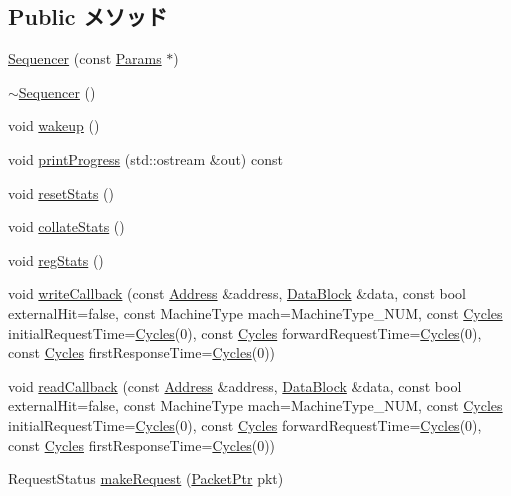 \subsection*{Public メソッド}
\begin{DoxyCompactItemize}
\item 
\hyperlink{classSequencer_a5f15f2d0a36488220062dc04ca597b6e}{Sequencer} (const \hyperlink{classSequencer_a55b8bba242820df379c5d9139a854e5b}{Params} $\ast$)
\item 
\hyperlink{classSequencer_a33e9de4a3e9618f014e48385c51abe67}{$\sim$Sequencer} ()
\item 
void \hyperlink{classSequencer_ae674290a26ecbd622c5160e38e8a4fe9}{wakeup} ()
\item 
void \hyperlink{classSequencer_a5108f0f12fa601b4c6713ee79510ef83}{printProgress} (std::ostream \&out) const 
\item 
void \hyperlink{classSequencer_a65880e61108132689a1bd769b9187fb7}{resetStats} ()
\item 
void \hyperlink{classSequencer_a208669cbc0bb1d52565956ca8c690c55}{collateStats} ()
\item 
void \hyperlink{classSequencer_a4dc637449366fcdfc4e764cdf12d9b11}{regStats} ()
\item 
void \hyperlink{classSequencer_a97f81494e28695a87ea2fdc0346ceb30}{writeCallback} (const \hyperlink{classAddress}{Address} \&address, \hyperlink{classDataBlock}{DataBlock} \&data, const bool externalHit=false, const MachineType mach=MachineType\_\-NUM, const \hyperlink{classCycles}{Cycles} initialRequestTime=\hyperlink{classCycles}{Cycles}(0), const \hyperlink{classCycles}{Cycles} forwardRequestTime=\hyperlink{classCycles}{Cycles}(0), const \hyperlink{classCycles}{Cycles} firstResponseTime=\hyperlink{classCycles}{Cycles}(0))
\item 
void \hyperlink{classSequencer_a6b6826ba925b0aa2cad4601dcb8dd5ee}{readCallback} (const \hyperlink{classAddress}{Address} \&address, \hyperlink{classDataBlock}{DataBlock} \&data, const bool externalHit=false, const MachineType mach=MachineType\_\-NUM, const \hyperlink{classCycles}{Cycles} initialRequestTime=\hyperlink{classCycles}{Cycles}(0), const \hyperlink{classCycles}{Cycles} forwardRequestTime=\hyperlink{classCycles}{Cycles}(0), const \hyperlink{classCycles}{Cycles} firstResponseTime=\hyperlink{classCycles}{Cycles}(0))
\item 
RequestStatus \hyperlink{classSequencer_a23de6e3fbb2362f4410d435e3600d0f7}{makeRequest} (\hyperlink{classPacket}{PacketPtr} pkt)
\item 

\end{DoxyCompactItemize}
